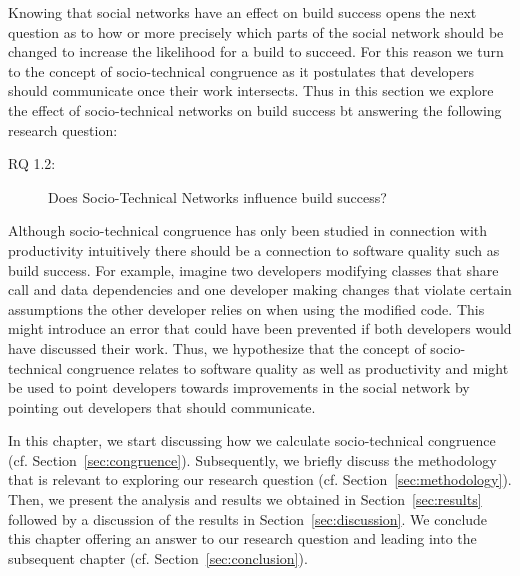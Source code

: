 \label{chap:stc-net2}
Knowing that social networks have an effect on build success opens the next question as to how or more precisely which parts of the social network should be changed to increase the likelihood for a build to succeed.
For this reason we turn to the concept of socio-technical congruence as it postulates that developers should communicate once their work intersects.
Thus in this section we explore the effect of socio-technical networks on build success bt answering the following research question:

\begin{description}
  \item[RQ 1.2:] Does Socio-Technical Networks influence build success?
\end{description}

Although socio-technical congruence has only been studied in connection with productivity intuitively there should be a connection to software quality such as build success.
For example, imagine two developers modifying classes that share call and data dependencies and one developer making changes that violate certain assumptions the other developer relies on when using the modified code.
This might introduce an error that could have been prevented if both developers would have discussed their work.
Thus, we hypothesize that the concept of socio-technical congruence relates to software quality as well as productivity and might be used to point developers towards improvements in the social network by pointing out developers that should communicate.

In this chapter, we start discussing how we calculate socio-technical congruence (cf. Section~\ref{sec:congruence}).
Subsequently, we briefly discuss the methodology that is relevant to exploring our research question (cf. Section~\ref{sec:methodology}).
Then, we present the analysis and results we obtained in Section~\ref{sec:results} followed by a discussion of the results in Section~\ref{sec:discussion}.
We conclude this chapter offering an answer to our research question and leading into the subsequent chapter (cf. Section~\ref{sec:conclusion}).


